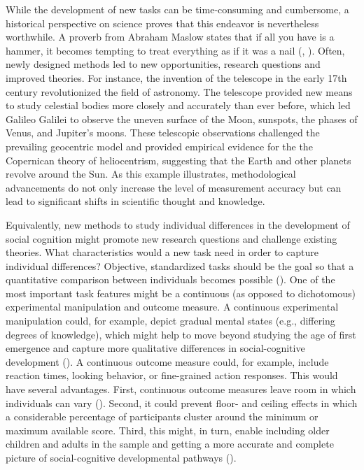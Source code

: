 \documentclass[
]{scrbook}
\begin{document}
While the development of new tasks can be time-consuming and cumbersome, a historical perspective on science proves that this endeavor is nevertheless worthwhile. A proverb from Abraham Maslow states that if all you have is a hammer, it becomes tempting to treat everything as if it was a nail (, ). Often, newly designed methods led to new opportunities, research questions and improved theories. For instance, the invention of the telescope in the early 17th century revolutionized the field of astronomy. The telescope provided new means to study celestial bodies more closely and accurately than ever before, which led Galileo Galilei to observe the uneven surface of the Moon, sunspots, the phases of Venus, and Jupiter's moons. These telescopic observations challenged the prevailing geocentric model and provided empirical evidence for the the Copernican theory of heliocentrism, suggesting that the Earth and other planets revolve around the Sun. As this example illustrates, methodological advancements do not only increase the level of measurement accuracy but can lead to significant shifts in scientific thought and knowledge.

Equivalently, new methods to study individual differences in the development of social cognition might promote new research questions and challenge existing theories. What characteristics would a new task need in order to capture individual differences? Objective, standardized tasks should be the goal so that a quantitative comparison between individuals becomes possible (). One of the most important task features might be a continuous (as opposed to dichotomous) experimental manipulation and outcome measure. A continuous experimental manipulation could, for example, depict gradual mental states (e.g., differing degrees of knowledge), which might help to move beyond studying the age of first emergence and capture more qualitative differences in social-cognitive development (). A continuous outcome measure could, for example, include reaction times, looking behavior, or fine-grained action responses. This would have several advantages. First, continuous outcome measures leave room in which individuals can vary (). Second, it could prevent floor- and ceiling effects in which a considerable percentage of participants cluster around the minimum or maximum available score. Third, this might, in turn, enable including older children and adults in the sample and getting a more accurate and complete picture of social-cognitive developmental pathways ().
\end{document}
